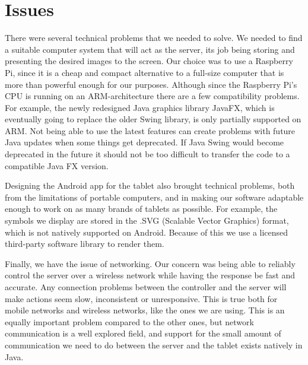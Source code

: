 \documentclass[12pt,a4paper,notitlepage]{report}
\begin{document}


\section{Issues}
There were several technical problems that we needed to solve. We needed to find a suitable computer system that will act as the server, its job being storing and presenting the desired images to the screen. Our choice was to use a Raspberry Pi, since it is a cheap and compact alternative to a full-size computer that is more than powerful enough for our purposes. Although since the Raspberry Pi's CPU is running on an ARM-architecture there are a few compatibility problems. For example, the newly redesigned Java graphics library JavaFX, which is eventually going to replace the older Swing library, is only partially supported on ARM. Not being able to use the latest features can create problems with future Java updates when some things get deprecated. If Java Swing would become deprecated in the future it should not be too difficult to transfer the code to a compatible Java FX version.

Designing the Android app for the tablet also brought technical problems, both from the limitations of portable computers, and in making our software adaptable enough to work on as many brands of tablets as possible. For example, the symbols we display are stored in the .SVG (Scalable Vector Graphics) format, which is not natively supported on Android. Because of this we use a licensed third-party software library to render them. 

Finally, we have the issue of networking. Our concern was being able to reliably control the server over a wireless network while having the response be fast and accurate. Any connection problems between the controller and the server will make actions seem slow, inconsistent or unresponsive. This is true both for mobile networks and wireless networks, like the ones we are using. This is an equally important problem compared to the other ones, but network communication is a well explored field, and support for the small amount of communication we need to do between the server and the tablet exists natively in Java.
\end{document}
